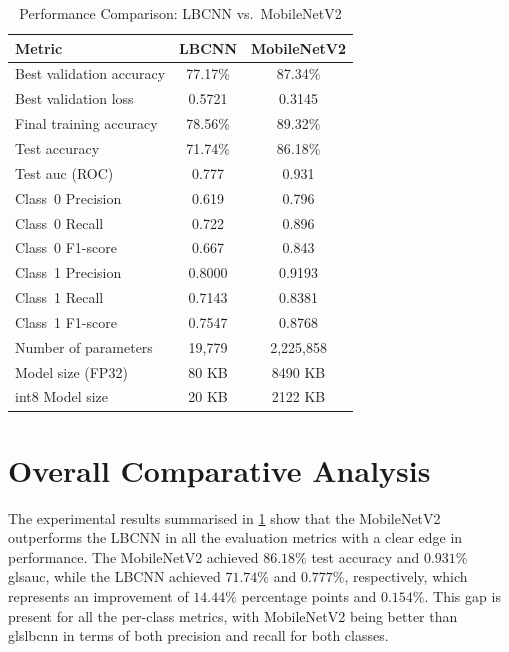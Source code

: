 \begin{table}[H]
\renewcommand{\arraystretch}{1.25}
\caption{Performance Comparison: LBCNN vs.\ MobileNetV2}
\label{tab:model_comparison}
\centering
\begin{tabular}{lcc}
\toprule
\textbf{Metric}                  & \textbf{LBCNN}      & \textbf{MobileNetV2}  \\
\midrule
Best validation accuracy         & 77.17\%             & 87.34\%               \\
Best validation loss             & 0.5721              & 0.3145                \\
Final training accuracy          & 78.56\%             & 89.32\%               \\
\midrule
Test accuracy                    & 71.74\%             & 86.18\%               \\
Test \gls{auc} (ROC)             & 0.777               & 0.931                 \\
\midrule
Class~0 Precision                & 0.619               & 0.796                \\
Class~0 Recall                   & 0.722               & 0.896                \\
Class~0 F1-score                 & 0.667               & 0.843                \\
\midrule
Class~1 Precision                & 0.8000              & 0.9193                \\
Class~1 Recall                   & 0.7143              & 0.8381                \\
Class~1 F1-score                 & 0.7547              & 0.8768                \\
\midrule
Number of parameters             & 19,779              & 2,225,858              \\
Model size (FP32)                & 80 KB               & 8490 KB                \\
\gls{int8} Model size            & 20 KB               & 2122 KB                \\
\bottomrule
\end{tabular}
\end{table}

\section{Overall Comparative Analysis}

The experimental results summarised in \cref{tab:model_comparison} show that the MobileNetV2 outperforms the LBCNN in all the evaluation metrics with a clear edge in performance. The MobileNetV2 achieved $86.18\%$ test accuracy and $0.931\%$ gls{auc}, while the LBCNN achieved $71.74\%$ and $0.777\%$, respectively, which represents an improvement of $14.44\%$ percentage points and $0.154\%$. This gap is present for all the per-class metrics, with MobileNetV2 being better than gls{lbcnn} in terms of both precision and recall for both classes.

